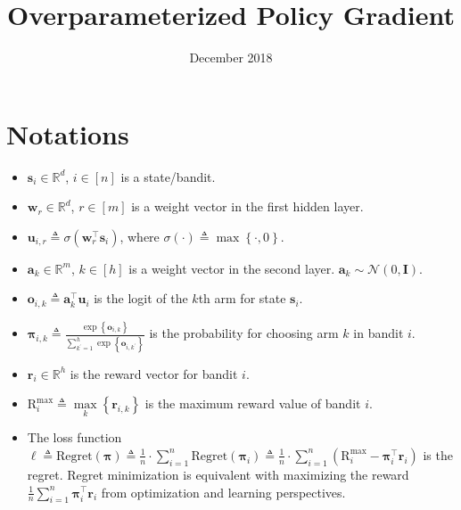 \documentclass[10pt]{article}
\title{Overparameterized Policy Gradient}
\author{}
\date{December 2018}
\begin{document}
\maketitle

\def\rva{{\mathbf{a}}}
\def\rvo{{\mathbf{o}}}
\def\rvr{{\mathbf{r}}}
\def\rvs{{\mathbf{s}}}
\def\rvu{{\mathbf{u}}}
\def\rvw{{\mathbf{w}}}
\def\rvx{{\mathbf{x}}}
\def\rvg{{\mathbf{g}}}
\def\rvone{{\mathbf{1}}}
\def\rvzero{{\mathbf{0}}}
\def\rvtilder{{\tilde{\mathbf{r}}}}

\def\rvp{{\mathbf{p}}}

\def\pr{{\text{Pr}}}
\def\r{{\text{R}}}

\def\regret{{\text{Regret}}}

\newtheorem{thm}{Theorem}
\newtheorem{lem}{Lemma}
\newtheorem{defi}{Definition}
\newtheorem{prop}{Proposition}
\newtheorem{remk}{Remark}


\def\rvpi{{\boldsymbol{\pi}}}

\def\rmI{{\mathbf{I}}}
\def\rmX{{\mathbf{X}}}

\def\sR{{\mathbb{R}}}
\def\sI{{\mathbb{I}}}

\def\gN{{\mathcal{N}}}
\def\gE{{\mathcal{E}}}

\section{Notations}

\begin{itemize}
	\item $\rvs_i \in \sR^d$, $i \in [n]$ is a state/bandit.
	\item $\rvw_r \in \sR^d$, $r \in [m]$ is a weight vector in the first hidden layer.
	\item $\rvu_{i,r} \triangleq \sigma(\rvw_r^\top \rvs_i)$, where $\sigma(\cdot) \triangleq \max\left\{ \cdot, 0 \right\}$.
	\item $\rva_k \in \sR^m$, $k \in [h]$ is a weight vector in the second layer. $\rva_k \sim \gN(0, \rmI)$.
	\item $\rvo_{i,k} \triangleq \rva_k^\top \rvu_i$ is the logit of the $k$th arm for state $\rvs_i$.
	\item $\rvpi_{i,k} \triangleq \frac{\exp\left\{ \rvo_{i,k} \right\}}{\sum\limits_{k^\prime = 1}^{h}{\exp\left\{ \rvo_{i,k^\prime} \right\}}}$ is the  probability for choosing arm $k$ in bandit $i$.
	\item $\rvr_i \in \sR^h$ is the reward vector for bandit $i$.
	\item $\r_i^{\max} \triangleq \max\limits_{k}\left\{ \rvr_{i,k} \right\}$ is the maximum reward value of bandit $i$.
	\item The loss function $\ell \triangleq \regret(\rvpi) \triangleq \frac{1}{n} \cdot \sum\limits_{i=1}^{n}{ \regret(\rvpi_i) } \triangleq \frac{1}{n} \cdot \sum\limits_{i=1}^{n}{ \left( \r_i^{\max} - \rvpi_i^\top \rvr_i \right) }$ is the regret. Regret minimization is equivalent with maximizing the reward $\frac{1}{n} \sum\limits_{i=1}^{n}{\rvpi_i^\top \rvr_i}$ from optimization and learning perspectives.
\end{itemize}
\end{document}
